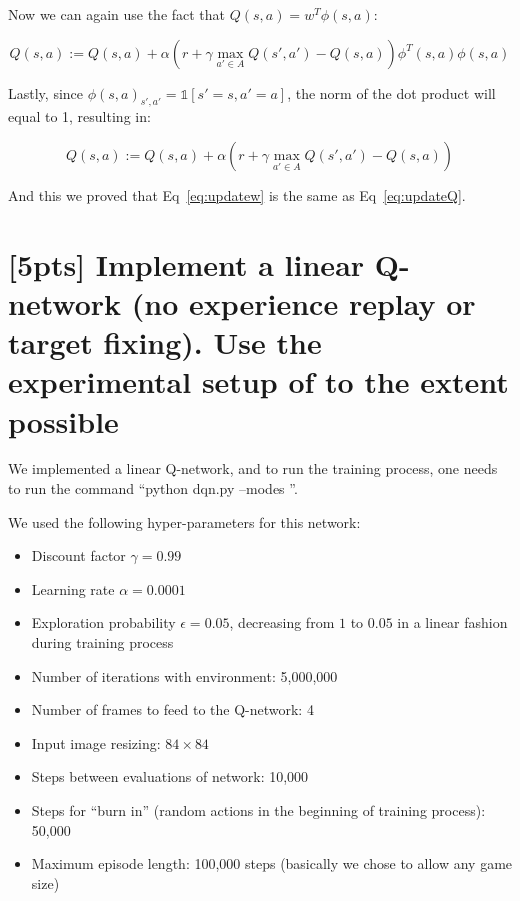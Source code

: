 \documentclass{article}
\begin{document}
Now we can again use the fact that $Q(s,a)=w^T\phi(s,a)$:

\begin{equation} \label{eq:derivation_3}
  Q(s,a) := Q(s,a) + \alpha \left(r+\gamma \max_{a' \in A} Q(s',a') - Q(s,a)\right) \phi^T(s,a) \phi(s,a)
\end{equation}

Lastly, since $\phi(s,a)_{s',a'} = \mathbb{1}[s'=s, a'=a]$, the norm of the dot product will equal to 1, resulting in:

\begin{equation} \label{eq:derivation_4}
  Q(s,a) := Q(s,a) + \alpha \left(r+\gamma \max_{a' \in A} Q(s',a') - Q(s,a)\right)
\end{equation}

And this we proved that Eq~\ref{eq:updatew} is the same as Eq~\ref{eq:updateQ}.

\section{[5pts] Implement a linear Q-network (no experience replay or target fixing). Use the experimental setup of \cite{mnih2013playing,mnih2015human} to the extent possible}

We implemented a linear Q-network, and to run the training process, one needs to run the command ``python dqn.py --modes ''.

We used the following hyper-parameters for this network:
\begin{itemize}
  \item Discount factor $\gamma=0.99$
  \item Learning rate $\alpha=0.0001$
  \item Exploration probability $\epsilon=0.05$, decreasing from $1$ to $0.05$ in a linear fashion during training process
  \item Number of iterations with environment: 5,000,000
  \item Number of frames to feed to the Q-network: 4
  \item Input image resizing: $84\times84$
  \item Steps between evaluations of network: 10,000
  \item Steps for ``burn in'' (random actions in the beginning of training process): 50,000
  \item Maximum episode length: 100,000 steps (basically we chose to allow any game size)
\end{itemize}
\end{document}
